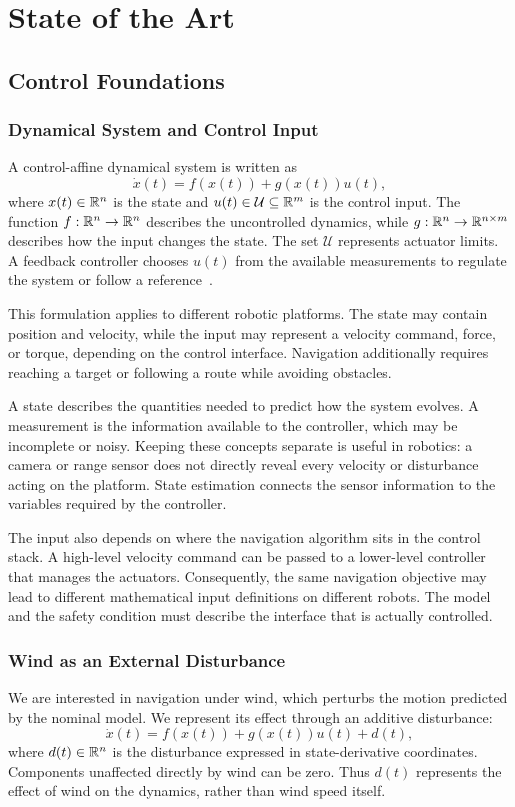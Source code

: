 \chapter{State of the Art}
\label{ch:stateart}
\section{Control Foundations}
\label{ch:navigation}

\subsection{Dynamical System and Control Input}
A control-affine dynamical system is written as
\begin{equation}
\dot x(t)=f(x(t))+g(x(t))u(t),
\label{eq:genericdynamics}
\end{equation}
where $x(t)\in\mathbb R^n$ is the state and $u(t)\in\mathcal U\subseteq\mathbb R^m$ is the control input. The function $f:\mathbb R^n\to\mathbb R^n$ describes the uncontrolled dynamics, while $g:\mathbb R^n\to\mathbb R^{n\times m}$ describes how the input changes the state. The set $\mathcal U$ represents actuator limits. A feedback controller chooses $u(t)$ from the available measurements to regulate the system or follow a reference~\cite{rootFeedback}.

This formulation applies to different robotic platforms. The state may contain position and velocity, while the input may represent a velocity command, force, or torque, depending on the control interface. Navigation additionally requires reaching a target or following a route while avoiding obstacles.

A state describes the quantities needed to predict how the system evolves. A measurement is the information available to the controller, which may be incomplete or noisy. Keeping these concepts separate is useful in robotics: a camera or range sensor does not directly reveal every velocity or disturbance acting on the platform. State estimation connects the sensor information to the variables required by the controller.

The input also depends on where the navigation algorithm sits in the control stack. A high-level velocity command can be passed to a lower-level controller that manages the actuators. Consequently, the same navigation objective may lead to different mathematical input definitions on different robots. The model and the safety condition must describe the interface that is actually controlled.

\subsection{Wind as an External Disturbance}
We are interested in navigation under wind, which perturbs the motion predicted by the nominal model. We represent its effect through an additive disturbance:
\begin{equation}
\dot x(t)=f(x(t))+g(x(t))u(t)+d(t),
\label{eq:disturbeddynamics}
\end{equation}
where $d(t)\in\mathbb R^n$ is the disturbance expressed in state-derivative coordinates. Components unaffected directly by wind can be zero. Thus $d(t)$ represents the effect of wind on the dynamics, rather than wind speed itself.


